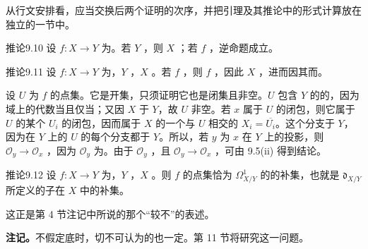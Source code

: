 从行文安排看，应当交换后两个证明的次序，并把引理及其推论中的形式计算放在独立的一节中。
\begin{SGAresult}{推论}{9.10}
设 $f\colon X\to Y$ 为。若 $Y$ ，则 $X$ ；若 $f$ ，逆命题成立。
\end{SGAresult}
\begin{SGAresult}{推论}{9.11}
设 $f\colon X\to Y$ 为，$Y$ ，$X$ 。若 $f$ ，则 $f$ ，因此 $X$ ，进而因其而。
\end{SGAresult}
设 $U$ 为 $f$ 的点集。它是开集，只须证明它也是闭集且非空。$U$ 包含 $Y$ 的的，因为域上的代数当且仅当；又因 $X$ 于 $Y$，故 $U$ 非空。若 $x$ 属于 $U$ 的闭包，则它属于 $U$ 的某个 $U_i$ 的闭包，因而属于 $X$ 的一个与 $U$ 相交的 $X_i=\overline{U_i}$。这个分支于 $Y$，因为在 $Y$ 上的 $U$ 的每个分支都于 $Y$。所以，若 $y$ 为 $x$ 在 $Y$ 上的投影，则 $\mathcal O_y\to\mathcal O_x$ ，因为 $\mathcal O_y$ 为。由于 $\mathcal O_y$ ，且 $\mathcal O_y\to\mathcal O_x$ ，可由 9.5(ii) 得到结论。
\begin{SGAresult}{推论}{9.12}
设 $f\colon X\to Y$ 为，$Y$ ，$X$ 。则 $f$ 的点集恰为 $\Omega^1_{X/Y}$ 的的补集，也就是 $\mathfrak d_{X/Y}$ 所定义的子在 $X$ 中的补集。
\end{SGAresult}
这正是第 4 节注记中所说的那个“较不”的表述。

\textbf{注记。}不假定底时，切不可认为的也一定。第 11 节将研究这一问题。

